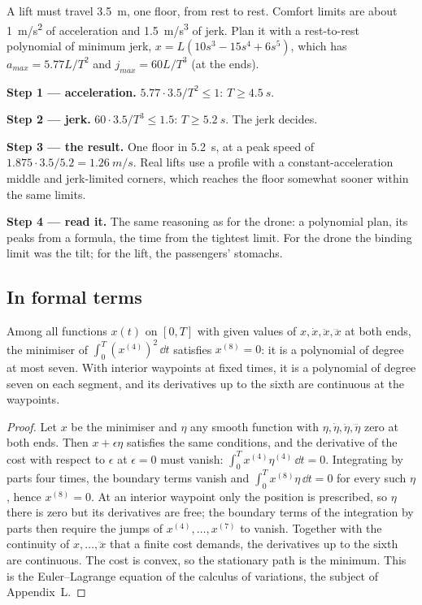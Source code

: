 \begin{example}
\label{ex:minsnap-lift}
A lift must travel \SI{3.5}{m}, one floor, from rest to rest. Comfort limits are about \SI{1}{m/s^2} of acceleration and \SI{1.5}{m/s^3} of jerk. Plan it with a rest-to-rest polynomial of minimum jerk, $x = L(10s^3 - 15s^4 + 6s^5)$, which has $a_{max} = 5.77L/T^2$ and $j_{max} = 60L/T^3$ (at the ends).

\textbf{Step 1 — acceleration.} $5.77 \cdot 3.5/T^2 \le 1$: $T \ge \SI{4.5}{s}$.

\textbf{Step 2 — jerk.} $60 \cdot 3.5/T^3 \le 1.5$: $T \ge \SI{5.2}{s}$. The jerk decides.

\textbf{Step 3 — the result.} One floor in \SI{5.2}{s}, at a peak speed of $1.875 \cdot 3.5/5.2 = \SI{1.26}{m/s}$. Real lifts use a profile with a constant-acceleration middle and jerk-limited corners, which reaches the floor somewhat sooner within the same limits.

\textbf{Step 4 — read it.} The same reasoning as for the drone: a polynomial plan, its peaks from a formula, the time from the tightest limit. For the drone the binding limit was the tilt; for the lift, the passengers' stomachs.
\end{example}

\subsection{In formal terms}

\begin{theorem}
\label{thm:minsnap-el}
Among all functions $x(t)$ on $[0, T]$ with given values of $x, \dot x, \ddot x, \dddot x$ at both ends, the minimiser of $\int_0^T (x^{(4)})^2\,\dd t$ satisfies $x^{(8)} = 0$: it is a polynomial of degree at most seven. With interior waypoints at fixed times, it is a polynomial of degree seven on each segment, and its derivatives up to the sixth are continuous at the waypoints.
\end{theorem}
\begin{proof}
Let $x$ be the minimiser and $\eta$ any smooth function with $\eta, \dot\eta, \ddot\eta, \dddot\eta$ zero at both ends. Then $x + \epsilon\eta$ satisfies the same conditions, and the derivative of the cost with respect to $\epsilon$ at $\epsilon = 0$ must vanish: $\int_0^T x^{(4)}\eta^{(4)}\,\dd t = 0$. Integrating by parts four times, the boundary terms vanish and $\int_0^T x^{(8)}\eta\,\dd t = 0$ for every such $\eta$, hence $x^{(8)} = 0$. At an interior waypoint only the position is prescribed, so $\eta$ there is zero but its derivatives are free; the boundary terms of the integration by parts then require the jumps of $x^{(4)}, \dots, x^{(7)}$ to vanish. Together with the continuity of $x, \dots, \dddot x$ that a finite cost demands, the derivatives up to the sixth are continuous. The cost is convex, so the stationary path is the minimum. This is the Euler--Lagrange equation of the calculus of variations, the subject of Appendix~L.
\end{proof}

